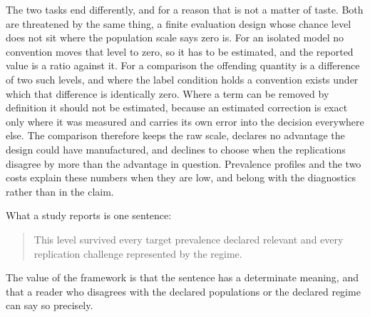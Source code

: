 \documentclass[11pt]{article}
\theoremstyle{remark}
\begin{document}
The two tasks end differently, and for a reason that is not a matter of taste. Both are threatened by the same thing, a finite evaluation design whose chance level does not sit where the population scale says zero is. For an isolated model no convention moves that level to zero, so it has to be estimated, and the reported value is a ratio against it. For a comparison the offending quantity is a difference of two such levels, and where the label condition holds a convention exists under which that difference is identically zero. Where a term can be removed by definition it should not be estimated, because an estimated correction is exact only where it was measured and carries its own error into the decision everywhere else. The comparison therefore keeps the raw scale, declares no advantage the design could have manufactured, and declines to choose when the replications disagree by more than the advantage in question. Prevalence profiles and the two costs explain these numbers when they are low, and belong with the diagnostics rather than in the claim.

What a study reports is one sentence:

\begin{quote}
This level survived every target prevalence declared relevant and every replication challenge represented by the regime.
\end{quote}

The value of the framework is that the sentence has a determinate meaning, and that a reader who disagrees with the declared populations or the declared regime can say so precisely.
\end{document}
